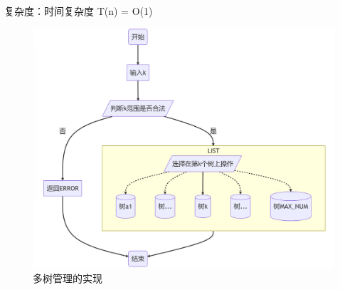 \documentclass[supercite]{Experimental_Report}
\theoremstyle{definition}
\begin{document}
\begin{enumerate}
复杂度：时间复杂度 T(n) = O(1)
\begin{figure}[htbp]
	\centering
	\begin{minipage}{0.7\linewidth}
		\centering
		\includegraphics[width=0.9\linewidth]{images/多树管理.png}
	\end{minipage}
	\caption{多树管理的实现}
	\label{fig2-7}
\end{figure}
\newpage

\end{enumerate}
\end{document}
